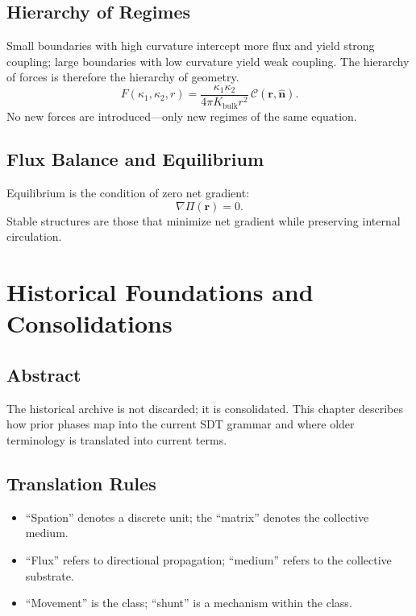 \documentclass[12pt]{book}
\begin{document}
\section{Hierarchy of Regimes}
Small boundaries with high curvature intercept more flux and yield strong coupling; large boundaries with
low curvature yield weak coupling. The hierarchy of forces is therefore the hierarchy of geometry.
\begin{equation}
F(\kappa_1,\kappa_2,r) = \frac{\kappa_1 \kappa_2}{4\pi K_{\text{bulk}} r^2}\,\mathcal{C}(\mathbf{r},\hat{\mathbf{n}}).
\end{equation}
No new forces are introduced—only new regimes of the same equation.

\section{Flux Balance and Equilibrium}
Equilibrium is the condition of zero net gradient:
\begin{equation}
\nabla \Pi(\mathbf{r}) = 0.
\end{equation}
Stable structures are those that minimize net gradient while preserving internal circulation.

\chapter{Historical Foundations and Consolidations}

\section*{Abstract}
The historical archive is not discarded; it is consolidated. This chapter describes how prior phases map
into the current SDT grammar and where older terminology is translated into current terms.

\section{Translation Rules}
\begin{itemize}
\item ``Spation'' denotes a discrete unit; the ``matrix'' denotes the collective medium.
\item ``Flux'' refers to directional propagation; ``medium'' refers to the collective substrate.
\item ``Movement'' is the class; ``shunt'' is a mechanism within the class.
\end{itemize}
\end{document}
